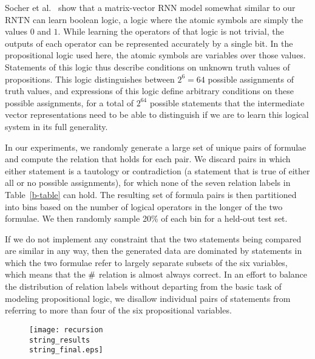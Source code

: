 Socher et al.~ show that a matrix-vector RNN
model somewhat similar to our RNTN can learn boolean logic, 
a logic where the atomic symbols are simply the
values $0$ and $1$. While learning the operators of that logic is not trivial, the outputs of
each operator can be represented accurately by a single bit.
In the propositional logic used here, the atomic symbols are variables over those values. 
Statements of this logic thus describe conditions on
unknown truth values of propositions. This logic distinguishes
between $2^{6} = 64$ possible assignments of truth values, and
expressions of this logic define arbitrary conditions on these
possible assignments, for a total of $2^{64}$ %
possible statements that the intermediate vector representations need
to be able to distinguish if we are to learn this logical system in its
full generality.

In our experiments, we randomly generate a large set of unique pairs 
of formulae and compute the relation that holds for each pair.
We discard pairs in which either statement is a tautology or
contradiction (a statement that is true of either all or no possible
assignments), for which none of the seven relation labels in
Table~\ref{b-table} can hold. The resulting set of formula pairs is
then partitioned into bins based on the number of logical operators in
the longer of the two formulae. We then randomly sample 20\% of each
bin for a held-out test set.

If we do not implement any constraint that the two statements being
compared are similar in any way, then the generated data are dominated
by statements in which the two formulae refer to largely separate
subsets of the six variables, which means that the $\mathbin{\#}$ relation
is almost always correct.  In an effort to balance the distribution of
relation labels without departing from the basic task of modeling
propositional logic, we disallow individual pairs of statements from
referring to more than four of the six propositional variables.

\begin{figure*}[t]
  \centering
  \texttt{[image: recursion\\string\_results\\string\_final.eps]}
  \caption{
    }  
  \label{prop-results}
\end{figure*}

